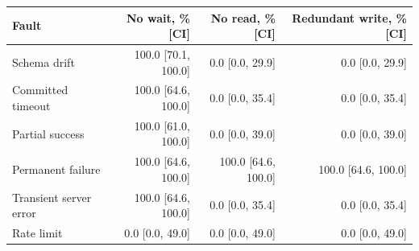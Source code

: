 \begin{tabular}{lrrr}\toprule
Fault & No wait, \% [CI] & No read, \% [CI] & Redundant write, \% [CI]\\ \midrule
Schema drift & 100.0 [70.1, 100.0] & 0.0 [0.0, 29.9] & 0.0 [0.0, 29.9]\\
Committed timeout & 100.0 [64.6, 100.0] & 0.0 [0.0, 35.4] & 0.0 [0.0, 35.4]\\
Partial success & 100.0 [61.0, 100.0] & 0.0 [0.0, 39.0] & 0.0 [0.0, 39.0]\\
Permanent failure & 100.0 [64.6, 100.0] & 100.0 [64.6, 100.0] & 100.0 [64.6, 100.0]\\
Transient server error & 100.0 [64.6, 100.0] & 0.0 [0.0, 35.4] & 0.0 [0.0, 35.4]\\
Rate limit & 0.0 [0.0, 49.0] & 0.0 [0.0, 49.0] & 0.0 [0.0, 49.0]\\
\bottomrule\end{tabular}
